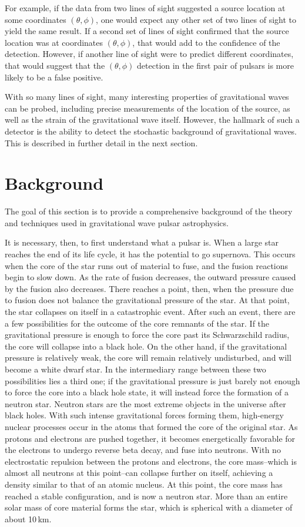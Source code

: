 \documentclass[12pt]{article}
\begin{document}
For example, if the data from two lines of sight suggested a source location
at some coordinates $(\theta,\phi)$, one would expect any other set of two lines of
sight to yield the same result. If a second set of lines of sight confirmed that
the source location was at coordinates $(\theta,\phi)$, that would add to the
confidence of the detection. However, if another line of sight were to predict
different coordinates, that would suggest that the $(\theta, \phi)$ detection in
the first pair of pulsars is more likely to be a false positive.

With so many lines of sight, many interesting properties of gravitational waves
can be probed, including precise measurements of the location of the source, as
well as the strain of the gravitational wave itself. However, the hallmark of
such a detector is the ability to detect the stochastic background of
gravitational waves. This is described in further detail in the next section.

\section{Background}
The goal of this section is to provide a comprehensive background of the theory
and techniques used in gravitational wave pulsar astrophysics.

It is necessary, then, to first understand what a pulsar is. When a large star
reaches the end of its life cycle, it has the potential to go supernova. This
occurs when the core of the star runs out of material to fuse, and the fusion
reactions begin to slow down. As the rate of fusion decreases, the outward
pressure caused by the fusion also decreases. There reaches a point, then, when
the pressure due to fusion does not balance the gravitational pressure of the
star. At that point, the star collapses on itself in a catastrophic event.
After such an event, there are a few possibilities for the outcome of the core
remnants of the star. If the gravitational pressure is enough to force the core
past its Schwarzschild radius, the core will collapse into a black hole. On the
other hand, if the gravitational pressure is relatively weak, the core will
remain relatively undisturbed, and will become a white dwarf star. In the
intermediary range between these two possibilities lies a third one; if the
gravitational pressure is just barely not enough to force the core into a black
hole state, it will instead force the formation of a neutron star.
Neutron stars are the most extreme objects in the universe after black holes. With such intense
gravitational forces forming them, high-energy nuclear processes occur in the
atoms that formed the core of the original star. As protons and electrons are
pushed together, it becomes energetically favorable for the electrons to undergo
reverse beta decay, and fuse into neutrons. With no electrostatic repulsion
between the protons and electrons, the core mass--which is almost all neutrons
at this point--can collapse further on itself, achieving a density similar to
that of an atomic nucleus. At this point, the core mass has reached a stable
configuration, and is now a neutron star. More than an entire solar mass of core
material forms the star, which is spherical with a diameter of about 10\,km.
\end{document}
